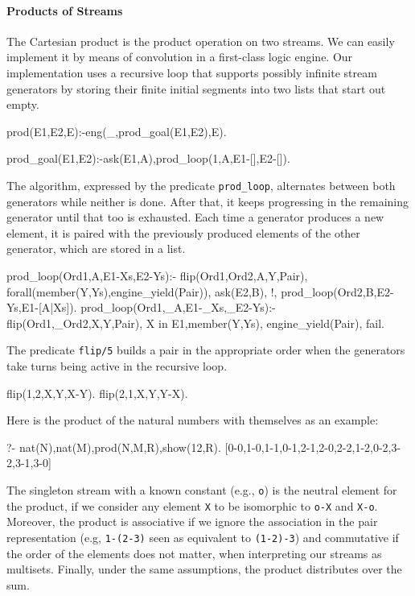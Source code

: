 \documentclass[submission,copyright,creativecommons]{eptcs}
\begin{document}
\paragraph{Products of Streams}

The Cartesian product is the product operation on two streams. We can
easily implement it by means of convolution in a first-class logic engine.
Our implementation uses a recursive loop that supports possibly infinite stream
generators by storing their finite initial segments into two lists that start
out empty.
\begin{code}
prod(E1,E2,E):-eng(_,prod_goal(E1,E2),E).

prod_goal(E1,E2):-ask(E1,A),prod_loop(1,A,E1-[],E2-[]).
\end{code}

The algorithm, expressed by the predicate {\tt prod\_loop},
alternates between both generators while neither is done.
After that, it keeps progressing in the remaining generator until 
that too is exhausted. Each time a generator produces a new element,
it is paired with the previously produced elements of the other generator,
which are stored in a list.
\begin{code}
prod_loop(Ord1,A,E1-Xs,E2-Ys):-
  flip(Ord1,Ord2,A,Y,Pair),
  forall(member(Y,Ys),engine_yield(Pair)),
  ask(E2,B),
  !,
  prod_loop(Ord2,B,E2-Ys,E1-[A|Xs]).
prod_loop(Ord1,_A,E1-_Xs,_E2-Ys):-
  flip(Ord1,_Ord2,X,Y,Pair),
  X in E1,member(Y,Ys),
  engine_yield(Pair),
  fail.
\end{code}

The predicate {\tt flip/5} builds a pair in the appropriate order
when the generators take turns being active in the recursive loop.
\begin{code} 
flip(1,2,X,Y,X-Y).
flip(2,1,X,Y,Y-X).
\end{code}
Here is the product of the natural numbers with themselves as an example:
\begin{codex}
?- nat(N),nat(M),prod(N,M,R),show(12,R).
[0-0,1-0,1-1,0-1,2-1,2-0,2-2,1-2,0-2,3-2,3-1,3-0]
\end{codex}

The singleton stream with a known constant (e.g., {\tt o}) is the neutral
element for the product, if we consider any element {\tt X} to be isomorphic to
{\tt o-X} and {\tt X-o}.  Moreover, the product is associative if we ignore the
association in the pair representation (e.g, {\tt 1-(2-3)} seen as equivalent to {\tt (1-2)-3})
and commutative if the order of the elements does not matter, when interpreting our streams as multisets.  Finally, under the same
assumptions, the product distributes over the sum.
\end{document}
